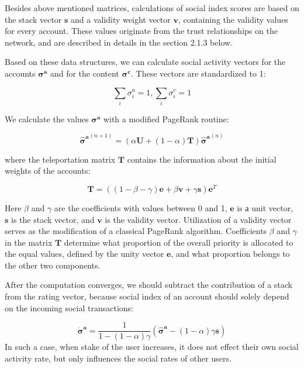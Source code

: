 \documentclass[a4paper,12pt]{article}
\begin{document}
	Besides above mentioned matrices, calculations of social index scores are based on the stack vector $\boldsymbol{s}$ and a validity weight vector $\boldsymbol{v}$, containing the validity values for every account. These values originate from the trust relationships on the network, and are described in details in the section 2.1.3 below.
	
	Based on these data structures, we can calculate social activity vectors for the accounts $\boldsymbol{\sigma^a}$ and for the content $\boldsymbol{\sigma^c}$. These vectors are standardized to 1:
	
	$$
	\sum_i{\sigma^a_i} = 1, \sum_i{\sigma^c_i} = 1
	$$
		
	
	We calculate the values $\boldsymbol{\sigma^a}$ with a modified PageRank routine:
	
	\begin{equation}
	\label{social_score_pgrank}
	\boldsymbol{\hat{\sigma}^a}^{(n+1)} = (\alpha \boldsymbol{U} + (1 - \alpha) \boldsymbol{T})\boldsymbol{ \hat{\sigma}^a}^{(n)}
	\end{equation}
	
	where the teleportation matrix $\boldsymbol{T}$ contains the information about the initial weights of the accounts:
	
	\begin{equation}
	    \label{teleportation_matrix_definition}
        \boldsymbol{T} = ((1 - \beta - \gamma) \boldsymbol{e} + \beta \boldsymbol{v} + \gamma \boldsymbol{s}) \boldsymbol{e}^T
	\end{equation}
	
	Here $\beta$ and $\gamma$ are the coefficients with values between 0 and 1, $\boldsymbol{e}$ is а unit vector, $\boldsymbol{s}$ is the stack vector, and $\boldsymbol{v}$ is the validity vector. Utilization of a validity vector serves as the modification of a classical PageRank algorithm. Coefficients $\beta$ and $\gamma$ in the matrix $\boldsymbol{T}$ determine what proportion of the overall priority is allocated to the equal values, defined by the unity vector $\boldsymbol{e}$, and what proportion belongs to the other two components.
	
	After the computation converges, we should subtract the contribution of a stack from the rating vector, because social index of an account should solely depend on the incoming social transactions:
	
	$$
	\boldsymbol{\dot{\sigma}^a} = \frac{1}{1 - (1-\alpha) \gamma}(\boldsymbol{\hat{\sigma}^a} - (1 - \alpha) \gamma \boldsymbol{s})
	$$
In such a case, when stake of the user increases, it does not effect their own social activity rate, but only influences the social rates of other users. 
\end{document}

